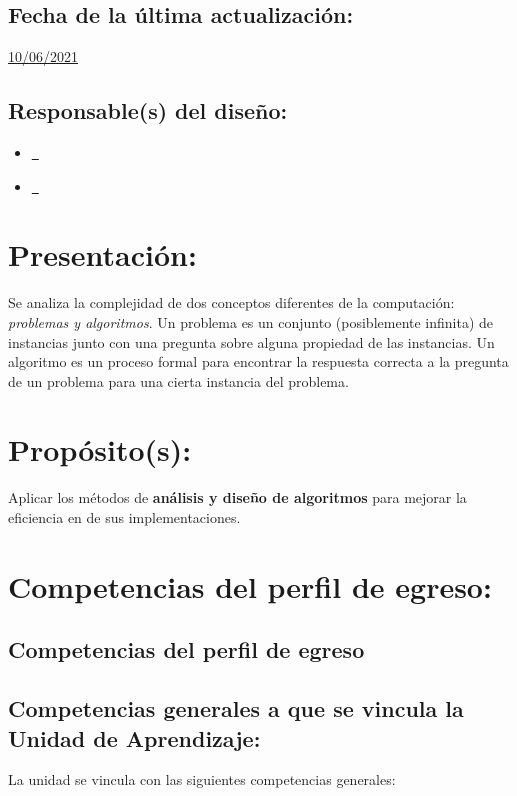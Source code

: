 \documentclass[10 pt]{article}
\begin{document}
\subsection{Fecha de la \'{u}ltima actualizaci\'{o}n:} \underline{10/06/2021}
\subsection{Responsable(s) del dise\~{n}o:}
\begin{itemize}[label={}]
\item \underline{\nferny~\ferny}
\item \underline{\nelisa~\elisa}
\end{itemize}
\newpage
\section{Presentaci\'{o}n:}

Se analiza la complejidad de dos conceptos diferentes de la
computaci\'{o}n: {\em problemas y algoritmos}. Un problema es un
conjunto (posiblemente infinita) de instancias junto con una pregunta
sobre alguna propiedad de las instancias.  Un algoritmo es un proceso
formal para encontrar la respuesta correcta a la pregunta de un
problema para una cierta instancia del problema. 
  
\section{Prop\'{o}sito(s):}

Aplicar los m\'{e}todos de {\bf an\'{a}lisis y dise\~{n}o de
  algoritmos} para mejorar la eficiencia en de sus implementaciones.

\section{Competencias del perfil de egreso:}
\subsection{Competencias del perfil de egreso}




\subsection{Competencias generales a que se vincula la Unidad de
    Aprendizaje:}

  La unidad se vincula con las siguientes competencias generales:
\end{document}
